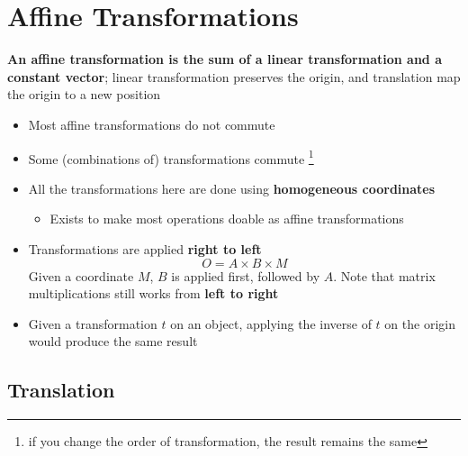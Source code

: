 \chapter{Affine Transformations}

\textbf{An affine transformation is the sum of a linear transformation and a
constant vector}; linear transformation preserves the origin, and translation
map the origin to a new position

\begin{itemize}
  \item Most affine transformations do not commute
  \item Some (combinations of) transformations commute
  \footnote{if you change the order of transformation, the result remains the
  same}
  \item All the transformations here are done using \textbf{homogeneous
  coordinates}
  \begin{itemize}
    \item Exists to make most operations doable as affine transformations
  \end{itemize}

  \item Transformations are applied \textbf{right to left}
  \begin{equation*}
    O = A \times B \times M
  \end{equation*}
  Given a coordinate $ M $, $ B $ is applied first, followed by $ A $. Note
  that matrix multiplications still works from \textbf{left to right}

  \item Given a transformation $ t $ on an object, applying the inverse of
  $ t $ on the origin would produce the same result
\end{itemize}

\section{Translation}

